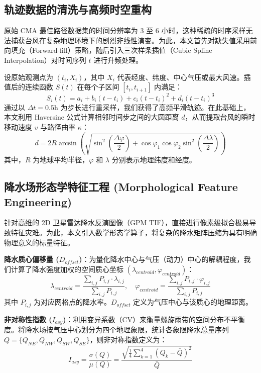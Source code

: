 \documentclass[12pt,a4paper]{ctexart}
\begin{document}
\subsection{轨迹数据的清洗与高频时空重构}
原始 CMA 最佳路径数据集的时间分辨率为 3 至 6 小时，这种稀疏的时序采样无法捕获台风在复杂地理环境下的剧烈非线性演变。为此，本文首先对缺失值采用前向填充（Forward-fill）策略，随后引入三次样条插值（Cubic Spline Interpolation）对时间序列 $t$ 进行升频处理。

设原始观测点为 $(t_i, X_i)$，其中 $X_i$ 代表经度、纬度、中心气压或最大风速。插值后的连续函数 $S(t)$ 在每个子区间 $[t_i, t_{i+1}]$ 内满足：
\begin{equation}
    S_i(t) = a_i + b_i(t-t_i) + c_i(t-t_i)^2 + d_i(t-t_i)^3
\end{equation}
通过以 $\Delta t = 0.5\text{h}$ 为步长进行重采样，我们获得了高频平滑轨迹。在此基础上，本文利用 Haversine 公式计算相邻时间步之间的大圆距离 $d$，从而提取台风的瞬时移动速度 $v$ 与路径曲率 $\kappa$：
\begin{equation}
    d = 2R \arcsin \left( \sqrt{\sin^2 \left( \frac{\Delta \varphi}{2} \right) + \cos \varphi_1 \cos \varphi_2 \sin^2 \left( \frac{\Delta \lambda}{2} \right)} \right)
\end{equation}
其中，$R$ 为地球平均半径，$\varphi$ 和 $\lambda$ 分别表示地理纬度和经度。

\subsection{降水场形态学特征工程 (Morphological Feature Engineering)}
针对高维的 2D 卫星雷达降水反演图像（GPM TIF），直接进行像素级拟合极易导致特征灾难。为此，本文引入数学形态学算子，将复杂的降水矩阵压缩为具有明确物理意义的标量特征。

\textbf{降水质心偏移量 ($D_{offset}$)}：为量化降水中心与气压（动力）中心的解耦程度，我们计算了降水强度加权的空间质心坐标 $(\lambda_{centroid}, \varphi_{centroid})$：
\begin{equation}
    \lambda_{centroid} = \frac{\sum_{i,j} P_{i,j} \cdot \lambda_{i,j}}{\sum_{i,j} P_{i,j}}, \quad 
    \varphi_{centroid} = \frac{\sum_{i,j} P_{i,j} \cdot \varphi_{i,j}}{\sum_{i,j} P_{i,j}}
\end{equation}
其中 $P_{i,j}$ 为对应网格点的降水率。$D_{offset}$ 定义为气压中心与该质心的地理距离。

\textbf{非对称性指数 ($I_{asy}$)}：利用变异系数（CV）来衡量螺旋雨带的空间分布不平衡度。将降水场按气压中心划分为四个地理象限，统计各象限降水总量序列 $Q = \{Q_{NE}, Q_{NW}, Q_{SW}, Q_{SE}\}$，则非对称指数定义为：
\begin{equation}
    I_{asy} = \frac{\sigma(Q)}{\mu(Q)} = \frac{\sqrt{\frac{1}{4}\sum_{k=1}^{4}(Q_k - \bar{Q})^2}}{\bar{Q}}
\end{equation}
\end{document}
